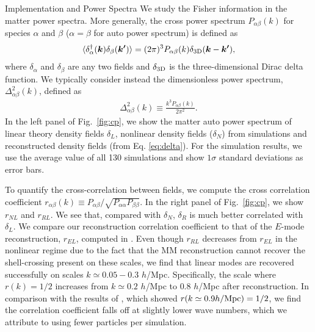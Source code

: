 \begin{section}{Implementation and Power Spectra}
 We study the Fisher information in the matter power
 spectra. More generally,
 the cross power spectrum $P_{\alpha\beta}(k)$ for species $\alpha$ and $\beta$
 ($\alpha=\beta$ for auto power spectrum) is defined as
 \begin{align}
   \langle \delta_\alpha^\dagger(\bm{k})\delta_\beta(\bm{k'}) \rangle =
   (2\pi)^3 P_{\alpha\beta}(k) \delta_{\rm {3D}}(\bm{k}-\bm{k'}),
 \end{align}
 where $\delta_{\alpha}$ and $\delta_{\beta}$ are any two fields and
 $\delta_{\rm{3D}}$ is the three-dimensional Dirac delta function. We typically consider instead
 the dimensionless power spectrum, $\Delta_{\alpha\beta}^2(k)$, defined as
 \begin{align}
   \Delta_{\alpha\beta}^2(k) \equiv \frac{k^3 P_{\alpha\beta}(k)}{2\pi ^2}.
 \end{align}
 In the left panel of Fig.~\ref{fig:cp}, we show the matter auto power
 spectrum of linear theory density fields $\delta_L$, nonlinear density
 fields ($\delta_N$) from simulations and reconstructed density fields
 (from Eq. \ref{eq:delta}).  For the simulation
 results, we use the average value of all 130 simulations and show
 $1\sigma$ standard deviations as error bars.  

 To quantify the cross-correlation
 between fields, we compute the cross correlation coefficient
 $r_{\alpha\beta}(k)\equiv P_{\alpha\beta}/\sqrt{P_{\alpha\alpha}P_{\beta\beta}}$.  In the right panel of
 Fig.~\ref{fig:cp}, we show $r_{NL}$ and $r_{RL}$.  We see that, compared with $\delta_N$,
 $\delta_R$ is much better correlated with $\delta_L$. 
 We compare our reconstruction correlation coefficient to that of the $E$-mode 
 reconstruction, $r_{EL}$, 
 computed in \citet{bib:Yu2016}.
 Even though $r_{RL}$ decreases from $r_{EL}$ in the nonlinear regime due to the fact that the MM reconstruction 
 cannot recover the shell-crossing present on these scales, we find that linear
 modes are recovered successfully on scales $k\simeq 0.05 - 0.3$ $h$/Mpc.
 Specifically, the scale where $r(k)=1/2$ increases from $k\simeq 0.2$ $h$/Mpc to
 $0.8$ $h$/Mpc after reconstruction.  In comparison with the results of \citet{bib:ZhuH2016},
 which showed $r(k\simeq0.9 h/\rm{Mpc})=1/2$, we find the correlation coefficient falls off at slightly lower
 wave numbers, which we attribute to using fewer particles per simulation.


\end{section}
